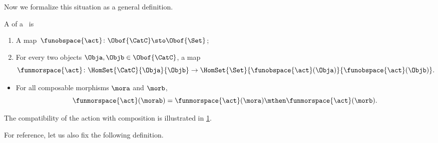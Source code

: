 Now we formalize this situation as a general definition.

\begin{ctdefinition}
    \label{def:semicategory-action}
    A  of a ~\CatC is

    \constit
    \begin{enumerate}
        \item A map~$\funobspace{\act} \colon \Obof{\CatC} \sto \Obof{\Set}$;
        \item For every two objects $\Obja, \Objb \in \Obof{\CatC}$, a map
              \begin{equation}
                  \funmorspace{\act} \colon \HomSet{\CatC}{\Obja}{\Objb} \to \HomSet{\Set}{ \funobspace{\act}(\Obja)}{\funobspace{\act}(\Objb)}.
              \end{equation}
    \end{enumerate}

    \condit

    \begin{itemize}
        \item For all composable morphisms $\mora$ and $\morb$,
              \begin{equation}
                  \funmorspace{\act}(\morab) = \funmorspace{\act}(\mora) \mthen \funmorspace{\act}(\morb).
              \end{equation}
    \end{itemize}
\end{ctdefinition}

The compatibility of the action with composition is illustrated in \cref{fig:semicat_ac_comm}.

\begin{figure}[h!]
    \centering
    \caption{}
    \label{fig:semicat_ac_comm}
\end{figure}

For reference, let us also fix the following definition.

